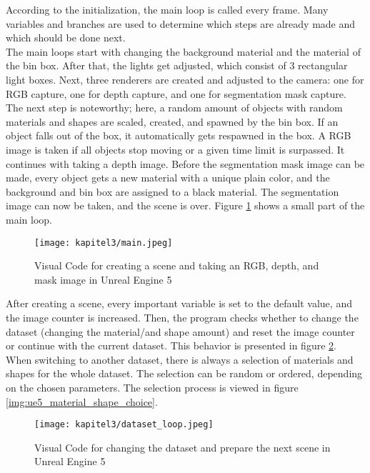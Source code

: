 		According to the initialization, the main loop is called every frame. Many variables and branches are used to determine which steps are already made and which should be done next.\\
		The main loops start with changing the background material and the material of the bin box. After that, the lights get adjusted, which consist of 3 rectangular light boxes. Next, three renderers are created and adjusted to the camera: one for RGB capture, one for depth capture, and one for segmentation mask capture. The next step is noteworthy; here, a random amount of objects with random materials and shapes are scaled, created, and spawned by the bin box. If an object falls out of the box, it automatically gets respawned in the box. A RGB image is taken if all objects stop moving or a given time limit is surpassed. It continues with taking a depth image. Before the segmentation mask image can be made, every object gets a new material with a unique plain color, and the background and bin box are assigned to a black material. The segmentation image can now be taken, and the scene is over. Figure \ref{img:ue5_main} shows a small part of the main loop.
		
		\begin{figure}[h]
			\centering
			\texttt{[image: kapitel3/main.jpeg]}
			\caption[Visual Code for creating a scene and taking an RGB, depth, and mask image in Unreal Engine 5 by Tobia Ippolito]{Visual Code for creating a scene and taking an RGB, depth, and mask image in Unreal Engine 5}
			\label{img:ue5_main}
		\end{figure}
		
		After creating a scene, every important variable is set to the default value, and the image counter is increased. Then, the program checks whether to change the dataset (changing the material/and shape amount) and reset the image counter or continue with the current dataset. This behavior is presented in figure \ref{img:ue5_dataset_loop}.\\
		When switching to another dataset, there is always a selection of materials and shapes for the whole dataset. The selection can be random or ordered, depending on the chosen parameters. The selection process is viewed in figure \ref{img:ue5_material_shape_choice}.
		
		\begin{figure}[h]
			\centering
			\texttt{[image: kapitel3/dataset\_loop.jpeg]}
			\caption[Visual Code for changing the dataset and prepare the next scene in Unreal Engine 5 by Tobia Ippolito]{Visual Code for changing the dataset and prepare the next scene in Unreal Engine 5}
			\label{img:ue5_dataset_loop}
		\end{figure}
		

